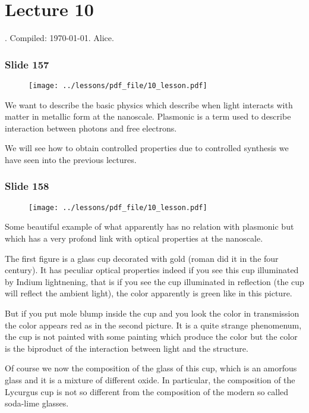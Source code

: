 \documentclass[../main/main.tex]{subfiles}
\begin{document}
\section{Lecture 10}
 . Compiled:  \today. Alice.
 

\subsubsection{Slide 157}

\begin{figure}[h!]
\centering
\texttt{[image: ../lessons/pdf\_file/10\_lesson.pdf]}
\end{figure}

We want to describe the basic physics which describe when light interacts with matter in metallic form at the nanoscale. Plasmonic is a term used to describe interaction between photons and free electrons.

We will see how to obtain controlled properties due to controlled synthesis we have seen into the previous lectures.

\newpage

\subsubsection{Slide 158}

\begin{figure}[h!]
\centering
\texttt{[image: ../lessons/pdf\_file/10\_lesson.pdf]}
\end{figure}

Some beautiful example of what apparently has no relation with plasmonic but which has a very profond link with optical properties at the nanoscale.

The first figure is a glass cup decorated with gold (roman did it in the four century).
It has peculiar optical properties indeed if you see this cup illuminated by Indium lightnening, that is if you see the cup illuminated in reflection (the cup will reflect the ambient light), the color apparently is green like in this picture.

But if you put mole blump inside the cup and you look the color in transmission the color appears red as in the second picture.
It is a quite strange phenomenum, the cup is not painted with some painting which produce the color but the color is the biproduct of the interaction between light and the structure.

Of course we now the composition of the glass of this cup, which is an amorfous glass and it is a mixture of different oxide.
In particular, the composition of the Lycurgus cup is not so different from the composition of the modern so called soda-lime glasses.
\end{document}

